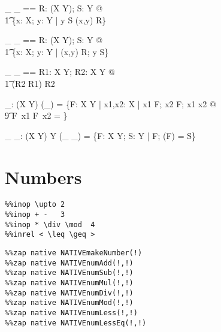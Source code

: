 \documentclass{article}
\begin{document}
\begin{axdef}[X,Y]
  \_ \rres \_ == 
      \lambda R: \assumed (X \rel Y); S: \assumed \power Y @ \\\t1
        \{x: \assumed X; y: \assumed Y | y \in S \land (x,y) \in R\}
\end{axdef}

\begin{axdef}[X,Y]
  \_ \nrres \_ == 
      \lambda R: \assumed (X \rel Y); S: \assumed \power Y @ \\\t1
        \{x: \assumed X; y: \assumed Y | (x,y) \in R; \lnot y \in S\}
\end{axdef}

\begin{axdef}[X,Y]
  \_ \oplus \_ == 
      \lambda R1: \assumed X \rel Y; R2: \assumed X \rel Y @ \\\t1
        (\dom R2 \ndres R1) \cup R2
\end{axdef}

\begin{axdef}[X,Y]
   \disjoint \_: \power (X \pfun \power Y) 
\where
   (\disjoint \_) =
     \{F: \assumed X \pfun \power Y |
        \forall x1,x2: X | x1 \in \dom F; x2 \in \dom F; x1 \neq x2 @ \\\t9
           F~x1 \cap F~x2 = \emptyset\}
\end{axdef}
           
\begin{axdef}[X,Y]
   \_ \partition \_: (X \pfun \power Y) \rel \power Y
\where
   (\_ \partition \_) =
     \{F: \assumed X \pfun \power Y; S: \power Y |
        \disjoint F; \bigcup (\ran F) = S\}
\end{axdef}
           




\section{Numbers}

\begin{verbatim}
%%inop \upto 2
%%inop + -   3
%%inop * \div \mod  4
%%inrel < \leq \geq > 
\end{verbatim}



\begin{verbatim}
%%zap native NATIVEmakeNumber(!) 
%%zap native NATIVEnumAdd(!,!) 
%%zap native NATIVEnumSub(!,!) 
%%zap native NATIVEnumMul(!,!) 
%%zap native NATIVEnumDiv(!,!) 
%%zap native NATIVEnumMod(!,!) 
%%zap native NATIVEnumLess(!,!)
%%zap native NATIVEnumLessEq(!,!)
\end{verbatim}
\end{document}
